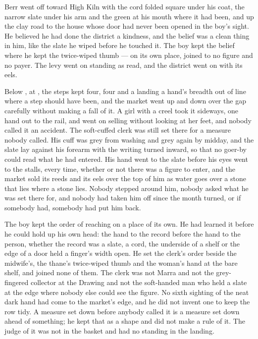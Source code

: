 Berr went off toward High Kiln with the cord folded square under his coat, the narrow slate under his arm and the green at his mouth where it had been, and up the clay road to the house whose door had never been opened in the boy's sight. He believed he had done the district a kindness, and the belief was a clean thing in him, like the slate he wiped before he touched it. The boy kept the belief where he kept the twice-wiped thumb --- on its own place, joined to no figure and no payer. The levy went on standing as read, and the district went on with its eels.

\scenebreak

Below , at , the steps kept four, four and a landing a hand's breadth out of line where a step should have been, and the market went up and down over the gap carefully without making a fall of it. A girl with a creel took it sideways, one hand out to the rail, and went on selling without looking at her feet, and nobody called it an accident. The soft-cuffed clerk was still set there for a measure nobody called. His cuff was grey from washing and grey again by midday, and the slate lay against his forearm with the writing turned inward, so that no goer-by could read what he had entered. His hand went to the slate before his eyes went to the stalls, every time, whether or not there was a figure to enter, and the market sold its reeds and its eels over the top of him as water goes over a stone that lies where a stone lies. Nobody stepped around him, nobody asked what he was set there for, and nobody had taken him off since the month turned, or if somebody had, somebody had put him back.

The boy kept the order of reaching on a place of its own. He had learned it before he could hold up his own head: the hand to the record before the hand to the person, whether the record was a slate, a cord, the underside of a shelf or the edge of a door held a finger's width open. He set the clerk's order beside the midwife's, the thane's twice-wiped thumb and the woman's hand at the bare shelf, and joined none of them. The clerk was not Marra and not the grey-fingered collector at the Drawing and not the soft-handed man who held a slate at the edge where nobody else could see the figure. No sixth sighting of the neat dark hand had come to the market's edge, and he did not invent one to keep the row tidy. A measure set down before anybody called it is a measure set down ahead of something; he kept that as a shape and did not make a rule of it. The judge of it was not in the basket and had no standing in the landing.

